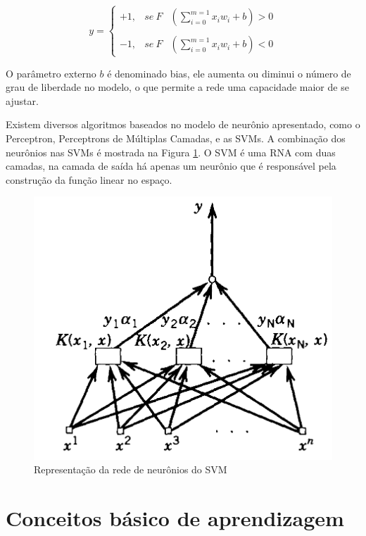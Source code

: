 \begin{equation} \label{svm:E0}
y = \left\{\begin{matrix}
+1, & se\ F & \left( \sum_{i=0}^{m=1} x_{i}w_{i} + b \right) > 0 \\ 
														       \\		
-1, & se\ F & \left( \sum_{i=0}^{m=1} x_{i}w_{i} + b \right) < 0
\end{matrix}\right.
\end{equation}

O parâmetro externo $b$ é denominado bias, ele aumenta ou diminui o número de grau de liberdade no modelo, o que permite a rede uma capacidade maior de se ajustar.

Existem diversos algoritmos baseados no modelo de neurônio apresentado, como o Perceptron, Perceptrons de Múltiplas Camadas, e as SVMs. A combinação dos neurônios nas SVMs é mostrada na Figura \ref{fig:SVM-RNA}. O SVM é uma RNA com duas camadas, na camada de saída há apenas um neurônio que é responsável pela construção da função linear no espaço.

\begin{figure}[htb]
	\centering
	\includegraphics[scale=0.5]{./figuras/SVM-RNA.png}
	\caption{Representação da rede de neurônios do SVM \cite{Vapnik1998}}
	\label{fig:SVM-RNA}
\end{figure}

\section{Conceitos básico de aprendizagem } \label{S2}

